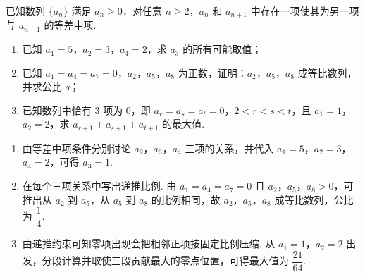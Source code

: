 \begin{problem}
已知数列 \(\{a_n\}\) 满足 \(a_n\ge0\)，对任意 \(n\ge2\)，\(a_n\) 和 \(a_{n+1}\) 中存在一项使其为另一项与 \(a_{n-1}\) 的等差中项.
\begin{enumerate}
\item 已知 \(a_1=5\)，\(a_2=3\)，\(a_4=2\)，求 \(a_3\) 的所有可能取值；
\item 已知 \(a_1=a_4=a_7=0\)，\(a_2\)，\(a_5\)，\(a_8\) 为正数，证明：\(a_2\)，\(a_5\)，\(a_8\) 成等比数列，并求公比 \(q\)；
\item 已知数列中恰有 \(3\) 项为 \(0\)，即 \(a_r=a_s=a_t=0\)，\(2<r<s<t\)，且 \(a_1=1\)，\(a_2=2\)，求 \(a_{r+1}+a_{s+1}+a_{t+1}\) 的最大值.
\end{enumerate}
\end{problem}

\begin{solution}
\begin{enumerate}
\item 由等差中项条件分别讨论 \(a_2\)，\(a_3\)，\(a_4\) 三项的关系，并代入 \(a_1=5\)，\(a_2=3\)，\(a_4=2\)，可得 \(a_3=1\).
\item 在每个三项关系中写出递推比例. 由 \(a_1=a_4=a_7=0\) 且 \(a_2\)，\(a_5\)，\(a_8>0\)，可推出从 \(a_2\) 到 \(a_5\)，从 \(a_5\) 到 \(a_8\) 的比例相同，故 \(a_2\)，\(a_5\)，\(a_8\) 成等比数列，公比为 \(\dfrac14\).
\item 由递推约束可知零项出现会把相邻正项按固定比例压缩. 从 \(a_1=1\)，\(a_2=2\) 出发，分段计算并取使三段贡献最大的零点位置，可得最大值为 \(\dfrac{21}{64}\).
\end{enumerate}
\end{solution}
